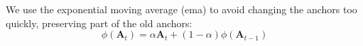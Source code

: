 We use the exponential moving average (ema) to avoid changing the anchors too quickly, preserving part of the old anchors:
\begin{equation}
    \phi (\textbf{A}_t) = \alpha \textbf{A}_t + (1 - \alpha) \phi (\textbf{A}_{t-1})
\end{equation}
